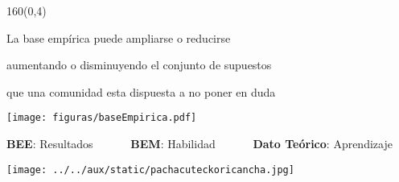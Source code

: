 \documentclass[shownotes,aspectratio=169]{beamer}
\newif\ifen
\newif\ifes
\newcommand{\en}[1]{\ifen#1\fi}
\newcommand{\es}[1]{\ifes#1\fi}
\begin{document}
\begin{frame}[plain]
 \begin{textblock}{160}(0,4)
 \centering \LARGE 
 \en{Levels of empírical basis}%
 \es{Niveles de base empírica}%
\end{textblock}
\vspace{1.2cm}

\centering

La base empírica puede ampliarse o reducirse 

aumentando o disminuyendo el conjunto de supuestos 

que una comunidad esta dispuesta a no poner en duda

\vspace{1cm}

\texttt{[image: figuras/baseEmpirica.pdf]}

\vspace{0.3cm}



\begin{center}
\normalsize 
 \textbf{BEE}: Resultados \ \ \ \ \ \  \textbf{BEM}: Habilidad \ \ \ \ \ \  \textbf{Dato Teórico}: Aprendizaje
\end{center}


\end{frame}



 
 
\begin{frame}[plain]
\centering
  \texttt{[image: ../../aux/static/pachacuteckoricancha.jpg]}
\end{frame}
\end{document}
